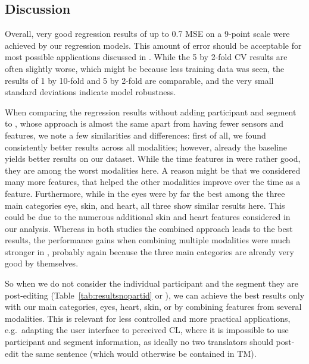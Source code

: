 \documentclass[output=paper]{langsci/langscibook}
\begin{document}


\subsection{Discussion}
Overall, very good regression results of up to 0.7 MSE on a 9-point scale were achieved by our regression models. This amount of error should be acceptable for most possible applications discussed in \cite{herbig2019chi}. %
While the 5 by 2-fold CV results are often slightly worse, which might be because less training data was seen, the results of 1 by 10-fold and 5 by 2-fold are comparable, and the very small standard deviations indicate model robustness.

When comparing the regression results without adding participant and segment to \citet{herbig2019mt}, whose approach is almost the same apart from having fewer sensors and features, we note a few similarities and differences: first of all, we found consistently better results across all modalities; however, already the baseline yields better results on our dataset. %
While the time features in \citet{herbig2019mt} were rather good, they are among the worst modalities here. A reason might be that we considered many more features, that helped the other modalities improve over the time as a feature.
Furthermore, while in \citet{herbig2019mt} the eyes were by far the best among the three main categories eye, skin, and heart, all three show similar results here. This could be due to the numerous additional skin and heart features considered in our analysis. Whereas in both studies the combined approach leads to the best results, the performance gains when combining multiple modalities were much stronger in \citet{herbig2019mt}, %
probably again because the three main categories are already very good by themselves. %

So when we do not consider the individual participant and the segment they are post-editing (Table~\ref{tab:resultsnopartid} or \citealp{herbig2019mt}), we can achieve the best results only with our main categories, eyes, heart, skin, or by combining features from several modalities.
This is relevant for less controlled and more practical applications, e.g.\ adapting the user interface to perceived CL, where it is impossible to use participant and segment information, as ideally no two translators should post-edit the same sentence (which would otherwise be contained in TM).
\end{document}
